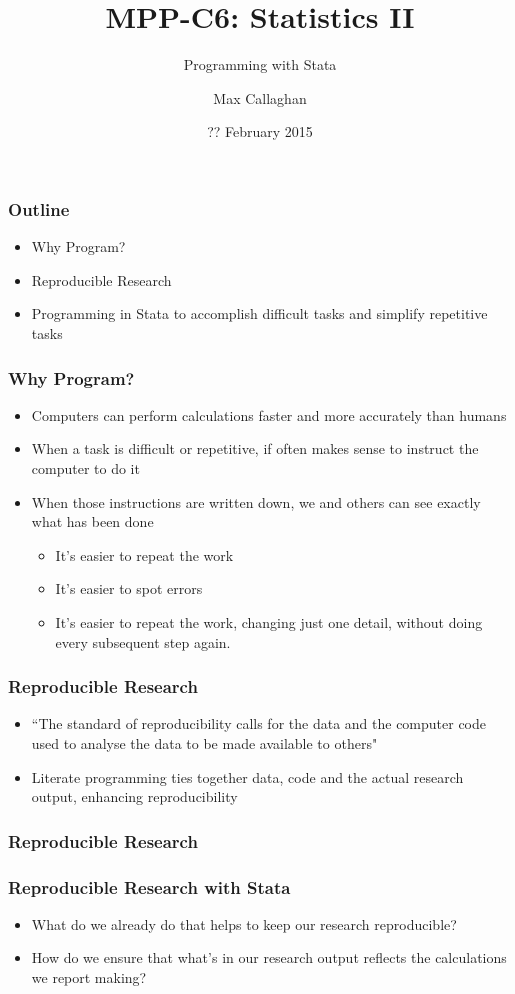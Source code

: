 \documentclass{beamer}
\title{MPP-C6: Statistics II}
\subtitle{Programming with Stata}
\author{Max Callaghan}
\institute[HSoG]{Hertie School of Governance}
\date{?? February 2015}
\begin{document}
\frame{\titlepage}

\begin{frame}
  \frametitle{Outline}
  \begin{itemize}
    \item Why Program?
    \item Reproducible Research
    \item Programming in Stata to accomplish difficult tasks and simplify repetitive tasks
  \end{itemize}
\end{frame}

\begin{frame}
  \frametitle{Why Program?}
  \begin{itemize}
    \item Computers can perform calculations faster and more accurately than humans
    \item When a task is difficult or repetitive, if often makes sense to instruct the computer to do it
    \item When those instructions are written down, we and others can see exactly what has been done
    \begin{itemize}
      \item It's easier to repeat the work
      \item It's easier to spot errors
      \item It's easier to repeat the work, changing just one detail, without doing every subsequent step again.
    \end{itemize}
  \end{itemize}
\end{frame}

\begin{frame}
  \frametitle{Reproducible Research}
  \begin{itemize}
    \item ``The standard of reproducibility calls for the data and the computer code used to analyse the data to be made available to others" \cite{Peng}
    \item Literate programming ties together data, code and the actual research output, enhancing reproducibility
  \end{itemize}
\end{frame}

\begin{frame}
  \frametitle{Reproducible Research}
  \frametitle{Reproducible Research with Stata}
  \begin{itemize}
    \item What do we already do that helps to keep our research reproducible?
    \item How do we ensure that what's in our research output reflects the calculations we report making?
  \end{itemize}
\end{frame}
\end{document}
